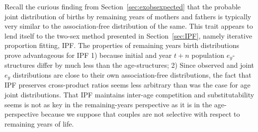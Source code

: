 
Recall the curious finding from Section~\ref{sec:exobsexpected} that the
probable joint distribution of births by remaining years of mothers and fathers is typically
very similar to the association-free distribution of the same. This trait
appears to lend itself to the two-sex method presented in Section~\ref{sec:IPF},
namely iterative proportion fitting, IPF. The properties of remaining
years birth distributions prove advantageous for IPF 1) because initial and year
$t+n$ population $e_y$-structures differ by much less than the age-structures;
2) Since observed and joint $e_y$ distributions are close to their own
association-free distributions, the fact that IPF preserves cross-product ratios
seems less arbitrary than was the case for age joint distributions. That IPF
maintains inter-age competition and substitutability seems is not as key in the
remaining-years perspective as it is in the age-perspective because we suppose
that couples are not selective with respect to remaining years of life.









